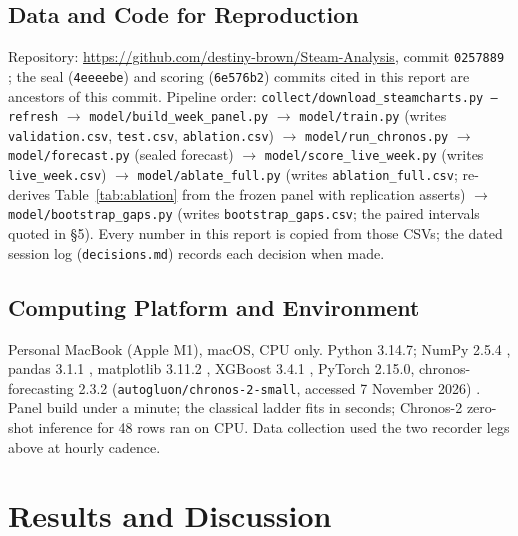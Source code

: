 \documentclass[10pt,letterpaper]{article}
\begin{document}
\subsection{Data and Code for Reproduction}
Repository: \url{https://github.com/destiny-brown/Steam-Analysis}, commit \texttt{0257889} \citep{group18repo}; the seal (\texttt{4eeeebe}) and scoring (\texttt{6e576b2}) commits cited in this report are ancestors of this commit. Pipeline order: \texttt{collect/download\_steamcharts.py --refresh} $\rightarrow$ \texttt{model/build\_week\_panel.py} $\rightarrow$ \texttt{model/train.py} (writes \texttt{validation.csv}, \texttt{test.csv}, \texttt{ablation.csv}) $\rightarrow$ \texttt{model/run\_chronos.py} $\rightarrow$ \texttt{model/forecast.py} (sealed forecast) $\rightarrow$ \texttt{model/score\_live\_week.py} (writes \texttt{live\_week.csv}) $\rightarrow$ \texttt{model/ablate\_full.py} (writes \texttt{ablation\_full.csv}; re-derives Table~\ref{tab:ablation} from the frozen panel with replication asserts) $\rightarrow$ \texttt{model/bootstrap\_gaps.py} (writes \texttt{bootstrap\_gaps.csv}; the paired intervals quoted in \S5). Every number in this report is copied from those CSVs; the dated session log (\texttt{decisions.md}) records each decision when made.

\subsection{Computing Platform and Environment}
Personal MacBook (Apple M1), macOS, CPU only. Python 3.14.7; NumPy 2.5.4 \citep{harris2020numpy}, pandas 3.1.1 \citep{mckinney2010pandas}, matplotlib 3.11.2 \citep{hunter2007matplotlib}, XGBoost 3.4.1 \citep{chen2016xgboost}, PyTorch 2.15.0, chronos-forecasting 2.3.2 (\texttt{autogluon/chronos-2-small}, accessed 7 November 2026) \citep{ansari2024chronos}. Panel build under a minute; the classical ladder fits in seconds; Chronos-2 zero-shot inference for 48 rows ran on CPU. Data collection used the two recorder legs above at hourly cadence.

\FloatBarrier
\section{Results and Discussion}
\end{document}
